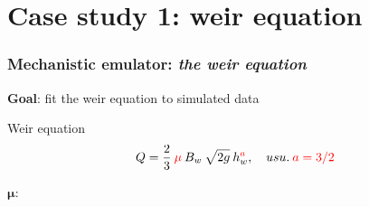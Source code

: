 \documentclass[xcolor=dvipsnames, USenglish]{beamer}  %
\begin{document}
\section{Case study 1: weir equation}

  \begin{frame}
    \frametitle{Mechanistic emulator: \emph{the weir equation}}
    \textbf{Goal}: fit the weir equation to simulated data\\
    \vfill
    \begin{alertblock}{Weir equation}
      \setlength\abovedisplayskip{0pt}
      \begin{equation*}
        Q = \frac{2}{3}\: \textcolor{red}{\mu}\: B_w\: \sqrt{2g}\: h_w^{\textcolor{red}{a}},
        \quad usu.\: \textcolor{red}{a = 3/2}
      \end{equation*}
    \end{alertblock}
    \vfill
    \centering
    $\boldsymbol{\mu :\,}$ 
  \end{frame}
\end{document}

